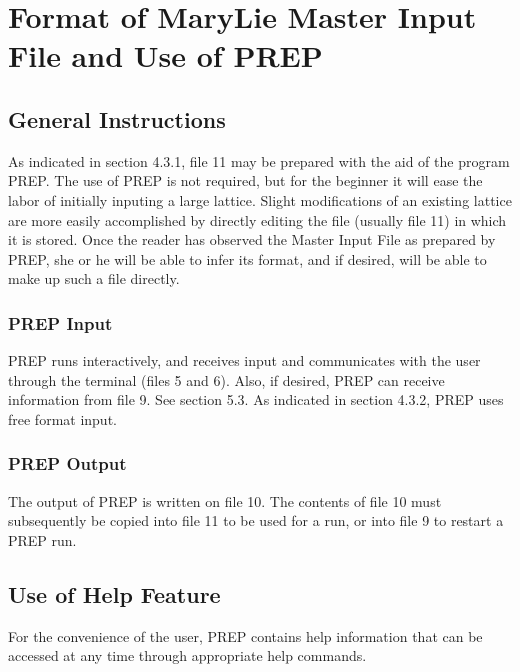
\chapter[Format of MaryLie Master Input File \& Use of PREP]{Format of
MaryLie Master Input File and Use of PREP} 

\section{General Instructions} As indicated in section 4.3.1, file 11 may
be prepared with the aid of the program PREP\@. The use of PREP is not
required, but for the beginner it will ease the labor of initially inputing a large lattice.
Slight modifications of an existing lattice are more easily accomplished by
directly editing the file (usually file 11) in which it is stored. Once the
reader has observed the Master Input File as prepared by PREP, she or he
will be able to infer its format, and if desired, will be able to make up
such a file directly.

\subsection{PREP Input} PREP runs interactively, and receives input and
communicates with the user through the terminal (files 5 and 6). Also, if
desired, PREP can receive information from file 9. See section 5.3. As
indicated in section 4.3.2, PREP uses free format input.

\subsection{PREP Output} The output of PREP is written on file 10. The
contents of file 10 must subsequently be copied into file 11 to be used for
a \Mary run, or into file 9 to restart a PREP run.

\section{Use of Help Feature} For the convenience of the user, PREP
contains help information that can be accessed at any time through
appropriate help commands.

